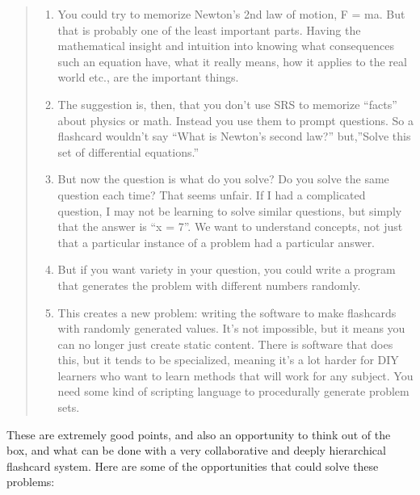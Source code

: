 \begin{quote}
\begin{enumerate}
\def\labelenumi{\arabic{enumi}.}
\tightlist
\item
  You could try to memorize Newton's 2nd law of motion, F = ma. But that
  is probably one of the least important parts. Having the mathematical
  insight and intuition into knowing what consequences such an equation
  have, what it really means, how it applies to the real world etc., are
  the important things.
\item
  The suggestion is, then, that you don't use SRS to memorize ``facts''
  about physics or math. Instead you use them to prompt questions. So a
  flashcard wouldn't say ``What is Newton's second law?'' but,''Solve
  this set of differential equations.''
\item
  But now the question is what do you solve? Do you solve the same
  question each time? That seems unfair. If I had a complicated
  question, I may not be learning to solve similar questions, but simply
  that the answer is ``x = 7''. We want to understand concepts, not just
  that a particular instance of a problem had a particular answer.
\item
  But if you want variety in your question, you could write a program
  that generates the problem with different numbers randomly.
\item
  This creates a new problem: writing the software to make flashcards
  with randomly generated values. It's not impossible, but it means you
  can no longer just create static content. There is software that does
  this, but it tends to be specialized, meaning it's a lot harder for
  DIY learners who want to learn methods that will work for any subject.
  You need some kind of scripting language to procedurally generate
  problem sets.
\end{enumerate}
\end{quote}

These are extremely good points, and also an opportunity to think out of
the box, and what can be done with a very collaborative and deeply
hierarchical flashcard system. Here are some of the opportunities that
could solve these problems:

